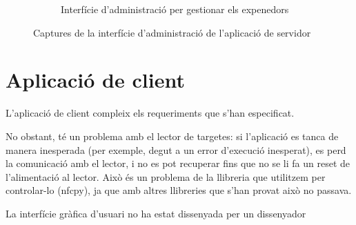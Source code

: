 \begin{figure}[H]
\begin{subfigure}[b]{0.45\textwidth}
		\caption{Interfície d'administració per gestionar els expenedors}
		\label{fig:admin2}
	\end{subfigure}
	\caption{Captures de la interfície d'administració de l'aplicació de servidor}
	\label{fig:admin-captures}
\end{figure}

\section{Aplicació de client}
L'aplicació de client compleix els requeriments que s'han especificat.

No obstant, té un problema amb el lector de targetes: si l'aplicació es tanca de manera inesperada (per exemple, degut a un error d'execució inesperat), es perd la comunicació amb el lector, i no es pot recuperar fins que no se li fa un reset de l'alimentació al lector. Això és un problema de la llibreria que utilitzem per controlar-lo (nfcpy), ja que amb altres llibreries que s'han provat això no passava.

La interfície gràfica d'usuari no ha estat dissenyada per un dissenyador

